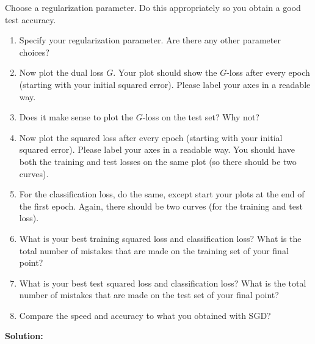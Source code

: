 \documentclass{article}
\newcommand{\solution}{\textbf{\vskip 0.2cm \large Solution:\\}}
\begin{document}
Choose a regularization parameter. Do this appropriately so you obtain a good test accuracy.

\begin{enumerate}
	\item Specify your regularization parameter. Are there any other parameter choices?
	\item  Now plot the dual loss $G$. Your plot should show the $G$-loss after every epoch (starting with your initial squared error). Please label your axes in a readable way.
	\item Does it make sense to plot the $G$-loss on the test set? Why not?
	\item  Now plot the squared loss after every epoch (starting with your initial squared error). Please label your axes in a readable way.  You should have both the training and test losses on the same plot (so there should be two curves).
	\item  For the classification loss, do the same, except start your plots at the end of the first epoch. Again, there should be two curves (for the training and test loss).
	\item   What is your best training squared loss and classification loss? What is the total number of mistakes that are made on the training set of your final point?
	\item   What is your best test squared loss and classification loss? What is the total number of mistakes that are made on the test set of your final point?
	\item Compare the speed and accuracy to what you obtained with SGD?
\end{enumerate}

\solution
\end{document}
